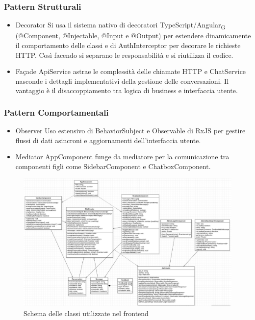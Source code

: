 \subsubsection*{Pattern Strutturali}
\begin{itemize}
    \item Decorator
    \newline\newline Si usa il sistema nativo di decoratori TypeScript/Angular\textsubscript{G} (@Component, @Injectable, @Input e @Output) per estendere dinamicamente il comportamento delle classi e di AuthInterceptor per decorare le richieste HTTP. Così facendo si separano le responsabilità e si riutilizza il codice.
    \item Façade
    \newline\newline ApiService astrae le complessità delle chiamate HTTP e ChatService nasconde i dettagli implementativi della gestione delle conversazioni. Il vantaggio è il disaccoppiamento tra logica di business e interfaccia utente. 
\end{itemize}
\subsubsection*{Pattern Comportamentali}
\begin{itemize}
    \item Observer
    \newline\newline Uso estensivo di BehaviorSubject e Observable di RxJS per gestire flussi di dati asincroni e aggiornamenti dell'interfaccia utente. 
    \item Mediator
    \newline\newline AppComponent funge da mediatore per la comunicazione tra componenti figli come SidebarComponent e ChatboxComponent. 
\end{itemize}


\begin{figure}[H]
    \centering
    \includegraphics[width=\textwidth]{images/FrontendUML.png}
    \caption{Schema delle classi utilizzate nel frontend}
    \label{fig:architettura}
\end{figure}

